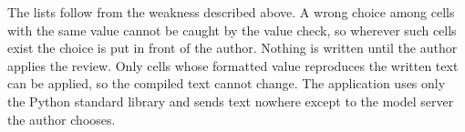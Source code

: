 The lists follow from the weakness described above. A wrong choice among cells with the same
value cannot be caught by the value check, so wherever such cells exist the choice is put in
front of the author. Nothing is written until the author applies the review. Only cells whose
formatted value reproduces the written text can be applied, so the compiled text cannot change.
The application uses only the Python standard library and sends text nowhere except to the model
server the author chooses.
